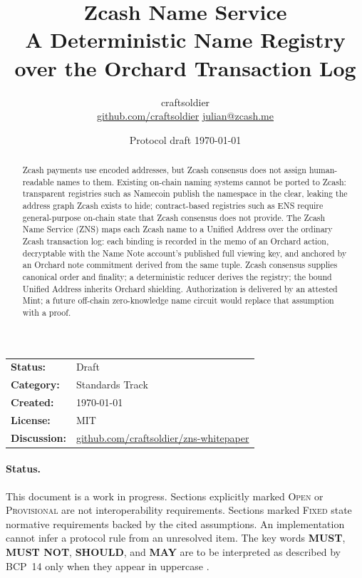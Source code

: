 \documentclass[11pt]{article}
\title{\textbf{Zcash Name Service}\\
\large A Deterministic Name Registry over the Orchard Transaction Log}
\author{craftsoldier\\
\href{https://github.com/craftsoldier}{github.com/craftsoldier} \quad \href{mailto:julian@zcash.me}{julian@zcash.me}}
\date{Protocol draft \textemdash{} \today}
\newcommand{\zns}{\textsc{ZNS}}
\newcommand{\openstatus}{\textsc{Open}}
\newcommand{\provisional}{\textsc{Provisional}}
\newcommand{\fixedstatus}{\textsc{Fixed}}
\begin{document}
\maketitle

\begin{center}
\begin{tabular}{@{}ll@{}}
\textbf{Status:} & Draft \\[0.2em]
\textbf{Category:} & Standards Track \\[0.2em]
\textbf{Created:} & \today \\[0.2em]
\textbf{License:} & MIT \\[0.2em]
\textbf{Discussion:} & \href{https://github.com/craftsoldier/zns-whitepaper}{github.com/craftsoldier/zns-whitepaper}
\end{tabular}
\end{center}

\begin{abstract}
Zcash payments use encoded addresses, but Zcash consensus does not assign human-readable names to them.
Existing on-chain naming systems cannot be ported to Zcash: transparent registries such as Namecoin publish the namespace in the clear, leaking the address graph Zcash exists to hide; contract-based registries such as ENS require general-purpose on-chain state that Zcash consensus does not provide.
The Zcash Name Service (\zns) maps each Zcash name to a Unified Address over the ordinary Zcash transaction log: each binding is recorded in the memo of an Orchard action, decryptable with the Name Note account's published full viewing key, and anchored by an Orchard note commitment derived from the same tuple.
Zcash consensus supplies canonical order and finality; a deterministic reducer derives the registry; the bound Unified Address inherits Orchard shielding.
Authorization is delivered by an attested Mint; a future off-chain zero-knowledge name circuit would replace that assumption with a proof.
\end{abstract}

\paragraph{Status.}
This document is a work in progress.
Sections explicitly marked \openstatus{} or \provisional{} are not interoperability requirements.
Sections marked \fixedstatus{} state normative requirements backed by the cited assumptions.
An implementation cannot infer a protocol rule from an unresolved item.
The key words \textbf{MUST}, \textbf{MUST NOT}, \textbf{SHOULD}, and \textbf{MAY} are to be interpreted as described by BCP~14 only when they appear in uppercase \cite{bcp14}.
\end{document}

